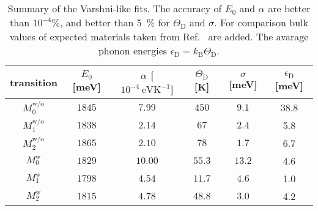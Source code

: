 \begin{table}
	\centering
	\caption{Summary of the Varshni-like fits. The accuracy of $E_0$ and $\alpha$ are better than $10^{-4}\%$, and better than 5~\% for $\Theta_\mathrm{D}$ and $\sigma$. For comparison bulk values of expected materials taken from Ref.~\cite{Vurgaftman} are added. The avarage phonon energies $\epsilon_\mathrm{D}=k_\mathrm{B}\Theta_\mathrm{D}$.}
	\begin{tabularx}{1\textwidth}{cccccc}
		\toprule
		
		transition & $E_0$ [meV]& $\alpha$ [$10^{-4}~\mathrm{eVK^{-1}}$]& $\Theta_\mathrm{D}$ [K]& $\sigma$ [meV]&  $\epsilon_\mathrm{D}$ [meV]\\ 	
		\midrule
		\midrule
		$M_0^\mathrm{w/o}$& $1845$ & $7.99$& $450$&$9.1$& 38.8\\
		$M_1^\mathrm{w/o}$& $1838$ & $2.14$& $67$&$2.4$&5.8\\
		$M_2^\mathrm{w/o}$ & $1865$ & $2.10$& $78$& $1.7$&6.7\\ 
		
		
		
		\midrule
		$M_0^\mathrm{w}$& $1829$ & $10.00$& $55.3$& $13.2$&4.6\\
		$M_1^\mathrm{w}$& $1798$ & $4.54$& $11.7$&$4.6$&1.0\\
		$M_2^\mathrm{w}$ & $1815$& $4.78$& $48.8$& $3.0$&4.2\\ 
		
		
		
		
		\midrule
		

\end{tabularx}
\end{table}
